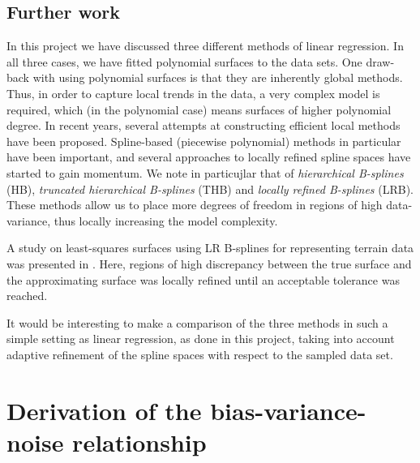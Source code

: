\documentclass[dvipsnames, article, a4paper, oneside, 12pt]{memoir}
\begin{document}
  \section{Further work}

  In this project we have discussed three different methods of linear
  regression.  In all three cases, we have fitted polynomial surfaces to the
  data sets. One draw-back with using polynomial surfaces is that they are
  inherently global methods. Thus, in order to capture local trends in the
  data, a very complex model is required, which (in the polynomial case) means
  surfaces of higher polynomial degree. In recent years, several attempts at
  constructing efficient local methods have been proposed. Spline-based
  (piecewise polynomial) methods in particular have been important, and several
  approaches to locally refined spline spaces have started to gain momentum.
  We note in particujlar that of \emph{hierarchical B-splines} (HB),
  \emph{truncated hierarchical B-splines} (THB) and \emph{locally refined
  B-splines} (LRB). These methods allow us to place more degrees of freedom in
  regions of high data-variance, thus locally increasing the model complexity.
  
  A study on least-squares surfaces using LR B-splines for representing terrain
  data was presented in \cite{skyttLocallyRefinedSpline2015}. Here, regions of
  high discrepancy between the true surface and the approximating surface was
  locally refined until an acceptable tolerance was reached.

  It would be interesting to make a comparison of the three methods in such a
  simple setting as linear regression, as done in this project, taking into
  account adaptive refinement of the spline spaces with respect to the sampled
  data set.
	
  \appendix
  \chapter{Derivation of the bias-variance-noise relationship}
  \label{ap:derivation}
  
\end{document}
